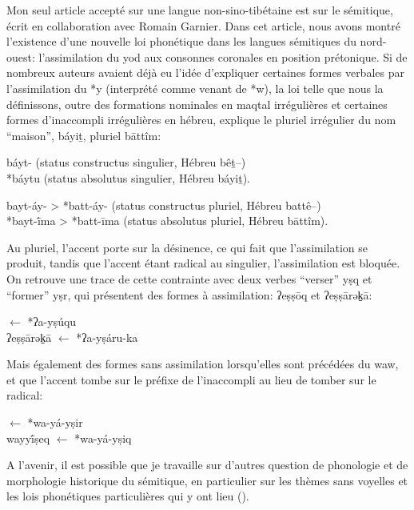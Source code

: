 \documentclass[oldfontcommands,oneside,a4paper,11pt]{memoir}
\newcommand{\ipa}[1]{{\phon #1}} %
\begin{document}
Mon seul article accepté sur une langue non-sino-tibétaine est \citet{rg-gj12yod} sur le sémitique, écrit en collaboration avec Romain Garnier. Dans cet article, nous avons montré l'existence d'une nouvelle loi phonétique dans les langues sémitiques du nord-ouest: l'assimilation du yod aux consonnes coronales en position prétonique. Si de nombreux auteurs avaient déjà eu l'idée d'expliquer certaines formes verbales par l'assimilation du *y (interprété comme venant de *w), la loi telle que nous la définissons, outre des formations nominales en maqtal irrégulières et certaines formes d'inaccompli irrégulières en hébreu, explique le pluriel irrégulier du nom ``maison'', \ipa{báyiṯ}, pluriel \ipa{bāttîm}:
\begin{exe} 
\ex *báyt-  (status constructus singulier, Hébreu  \ipa{bêṯ}--) \\ \label{bayit.sg}
 *báytu (status absolutus singulier, Hébreu \ipa{báyiṯ}). 
\end{exe}
\begin{exe} 
\ex *bayt-áy- > *batt-áy- (status constructus pluriel, Hébreu  \ipa{battê}--) \\ \label{bayit.pl}
  *bayt-ī́ma > *batt-īma (status absolutus pluriel, Hébreu \ipa{bāttîm}).
\end{exe}
Au pluriel, l'accent porte sur la désinence, ce qui fait que l'assimilation se produit, tandis que l'accent étant radical au singulier, l'assimilation est bloquée. On retrouve une trace de cette contrainte avec deux verbes ``verser'' yṣq et ``former'' yṣr, qui présentent des formes à assimilation: \ipa{ʔeṣṣōq} et \ipa{ʔeṣṣārək̠ā}:
\begin{exe} 
\ex  \ipa{ʔeṣṣōq}   $\leftarrow$ *ʔa-yṣúqu \\
  \ipa{ʔeṣṣārək̠ā} $\leftarrow$ *ʔa-yṣáru-ka \\ 
\end{exe}
Mais également des formes sans assimilation lorsqu'elles sont précédées du waw, et que l'accent tombe sur le préfixe de l'inaccompli au lieu de tomber sur le radical:

\begin{exe} 
\ex \ipa{wayyī́ṣer}  $\leftarrow$ *wa-yá-yṣir \\
  \ipa{wayyī́ṣeq} $\leftarrow$ *wa-yá-yṣiq 
\end{exe}
 
A l'avenir, il est possible que je travaille sur d'autres question de phonologie et de morphologie historique du sémitique, en particulier sur les thèmes sans voyelles et les lois phonétiques particulières qui y ont lieu (\citealt{testen85rn}).
\end{document}
